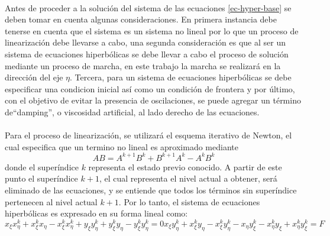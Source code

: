 \documentclass[letterpaper, openright, 12pt]{book}
\begin{document}
    \paragraph*{}
        Antes de proceder a la solución del sistema de las ecuaciones
        \ref{ec-hyper-base} se deben tomar en cuenta algunas consideraciones. En
        primera instancia debe tenerse en cuenta que el sistema es un sistema no
        lineal por lo que un proceso de linearización debe llevarse a cabo, una
        segunda consideración es que al ser un sistema de ecuaciones
        hiperbólicas se debe llevar a cabo el proceso de solución mediante un
        proceso de marcha, en este trabajo la marcha se realizará en la
        dirección del eje $\eta$. Tercera, para un sistema de ecuaciones
        hiperbólicas se debe especificar una condicion inicial así como un
        condición de frontera y por último, con el objetivo de evitar la
        presencia de oscilaciones, se puede agregar un término de``damping'', o
        viscosidad artificial, al lado derecho de las ecuaciones.
    \paragraph*{}
        Para el proceso de linearización, se utilizará el esquema iterativo de
        Newton, el cual especifica que un termino no lineal es aproximado
        mediante
        \begin{equation}
            AB = A^{k + 1} B^{k} + B^{k + 1} A^{k} - A^{k} B^{k}
        \end{equation}
        donde el superíndice $k$ representa el estado previo conocido. A partir
        de este punto el superíndice $k + 1$, el cual representa el nivel actual
        a obtener, será eliminado de las ecuaciones, y se entiende que todos los
        términos sin superíndice pertenecen al nivel actual $k + 1$. Por lo
        tanto, el sistema de ecuaciones hiperbólicas es expresado en su forma
        lineal como:
        \begin{subequations}
            \begin{equation}
                x_{\xi} x_{\eta}^{k} + x_{\xi}^{k} x_{\eta} - x_{\xi}^{k} x_{\eta}^{k} + y_{\xi} y_{\eta}^{k} + y_{\xi}^{k} y_{\eta} - y_{\xi}^{k} y_{\eta}^{k} = 0
            \end{equation}
            \begin{equation}
                x_{\xi} y_{\eta}^{k} + x_{\xi}^{k} y_{\eta} - x_{\xi}^{k} y_{\eta}^{k} - x_{\eta} y_{\xi}^{k} - x_{\eta}^{k} y_{\xi} + x_{\eta}^{k} y_{\xi}^{k} = F
            \end{equation}
            \label{ec-hyper-linear}
        \end{subequations}
\end{document}
